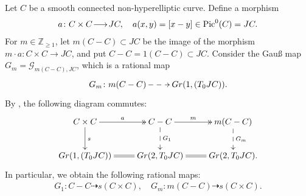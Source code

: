 \documentclass[a4paper,11pt,reqno]{amsart}
\makeatletter
\numberwithin{equation}{section}
\theoremstyle{plain}
\theoremstyle{definition}
\newcommand{\Z}{\mathbb Z}
\let\P\relax
\newcommand{\P}{\mathbb P}
\newcommand{\mr}[1]{{\mathscr{#1}}}
\let\rm\relax
\newcommand{\rm}[1]{{\mathrm{#1}}}
\newcommand{\Pic}{\operatorname{Pic}}
\renewcommand{\longrightarrow}{\xymatrix@1@=15pt{\ar[r]&}}
\makeatother
\begin{document}
Let $C$ be a smooth connected non-hyperelliptic curve. Define a morphism
\begin{align} \label{definition:a}
    a \colon C \times C \longrightarrow JC, \quad a(x,y) = [x-y] \in \Pic^0(C) = JC.
\end{align}
For $m \in \Z_{\geq 1}$, let $m(C - C) \subset JC$ be the image of the morphism $m \cdot a \colon C \times C \to JC$, and put $C - C = 1(C - C) \subset JC$. 
Consider the Gau{\ss} map $G_m = \mr G_{m(C-C), JC}$, which is a rational map
\begin{align} \label{equation:gauss}
\xymatrix{
G_m \colon m(C - C) \ar@{-->}[r] &    \rm{Gr}(1, \P(T_0JC)). 
}
\end{align}
By \cite[Lemma 3.1.1 \& Remark 3.1.2]{bardellipirola-curvesofgenusg}, the following diagram commutes:
\begin{align} \label{diagram:bardellipirola}
\begin{split}
\xymatrix{
C \times C  \ar@{->>}[r]^-a \ar[d]^s & C - C\ar@{-->}[d]^-{G_1}\ar@{->>}[r]^-m & m (C - C)\ar@{-->}[d]^-{G_m} \\
\rm{Gr}(1, \P(T_0JC)) \ar@{=}[r] & \rm{Gr}(2, T_0JC) \ar@{=}[r] & \rm{Gr}(2, T_0JC). 
}
\end{split}
\end{align}
In particular, we obtain the following rational maps:
\begin{align} \label{equation:rationalmaps}
G_1 \colon C - C \dashrightarrow s(C \times C), \quad G_m \colon m(C-C) \dashrightarrow s(C \times C).
\end{align}
\end{document}
